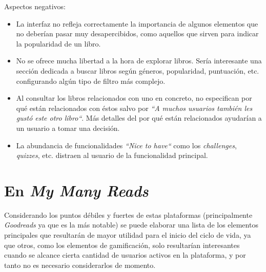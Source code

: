 Aspectos negativos:

\begin{itemize}
\item La interfaz no refleja correctamente la importancia de algunos elementos que no deberían pasar muy desapercibidos, como aquellos que sirven para indicar la popularidad de un libro.
\item No se ofrece mucha libertad a la hora de explorar libros. Sería interesante una sección dedicada a buscar libros según géneros, popularidad, puntuación, etc. configurando algún tipo de filtro más complejo.
\item Al consultar los libros relacionados con uno en concreto, no especifican por qué están relacionados con éstos salvo por \textit{``A muchos usuarios también les gustó este otro libro``}. Más detalles del por qué están relacionados ayudarían a un usuario a tomar una decisión.
\item La abundancia de funcionalidades \textit{``Nice to have``} como los \textit{challenges}, \textit{quizzes}, etc. distraen al usuario de la funcionalidad principal.
\end{itemize}

\section{En \textit{My Many Reads}}

Considerando los puntos débiles y fuertes de estas plataformas (principalmente \textit{Goodreads} ya que es la más notable) se puede elaborar una lista de los elementos principales que resultarán de mayor utilidad para el inicio del ciclo de vida, ya que otros, como los elementos de gamificación, solo resultarían interesantes cuando se alcance cierta cantidad de usuarios activos en la plataforma, y por tanto no es necesario considerarlos de momento.

